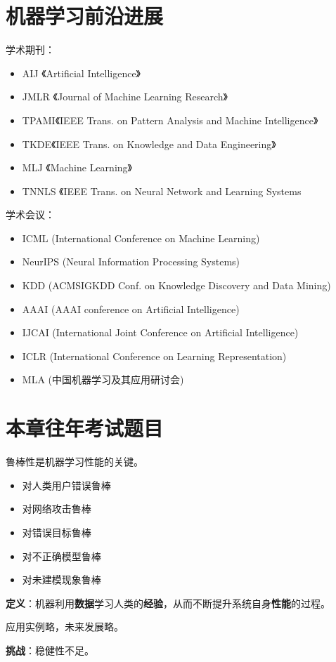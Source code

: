 \section{机器学习前沿进展}\label{sec:1.4}
学术期刊：
\begin{itemize}
\item AIJ 《Artificial Intelligence》
\item JMLR 《Journal of Machine Learning Research》
\item TPAMI《IEEE Trans. on Pattern Analysis and Machine Intelligence》
\item TKDE《IEEE Trans. on Knowledge and Data Engineering》
\item MLJ 《Machine Learning》
\item TNNLS 《IEEE Trans. on Neural Network and Learning Systems
\end{itemize}
学术会议：
\begin{itemize}
\item ICML (International Conference on Machine Learning)
\item NeurIPS (Neural Information Processing Systems)
\item KDD (ACMSIGKDD Conf. on Knowledge Discovery and Data Mining)
\item AAAI (AAAI conference on Artificial Intelligence)
\item IJCAI (International Joint Conference on Artificial Intelligence)
\item ICLR (International Conference on Learning Representation)
\item MLA (中国机器学习及其应用研讨会)
\end{itemize}

\section{本章往年考试题目}\label{sec:1.5}
鲁棒性是机器学习性能的关键。
\begin{itemize}
 \item 对人类用户错误鲁棒
 \item 对网络攻击鲁棒
 \item 对错误目标鲁棒
 \item 对不正确模型鲁棒
 \item 对未建模现象鲁棒
\end{itemize}

\textbf{定义}：机器利用\textbf{数据}学习人类的\textbf{经验}，从而不断提升系统自身\textbf{性能}的过程。

应用实例略，未来发展略。

\textbf{挑战}：稳健性不足。
